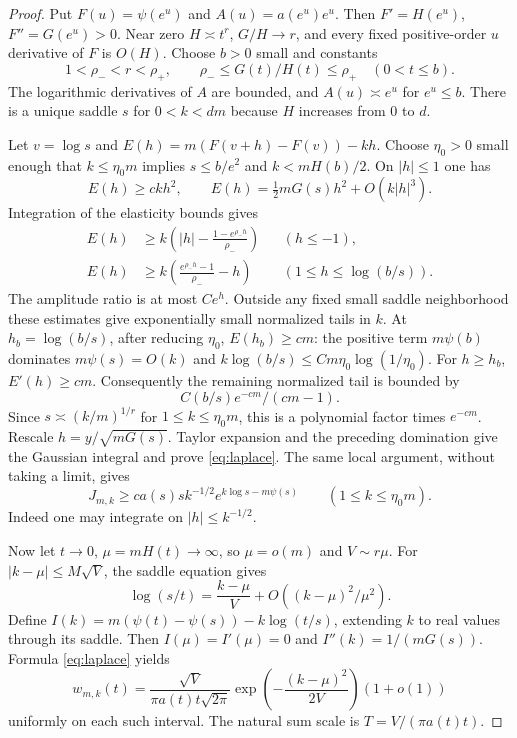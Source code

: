 \documentclass[11pt]{article}
\theoremstyle{remark}\newtheorem{remark}[theorem]{Remark}
\begin{document}
\begin{proof}
Put $F(u)=\psi(e^u)$ and $A(u)=a(e^u)e^u$. Then $F'=H(e^u)$,
$F''=G(e^u)>0$. Near zero $H\asymp t^r$, $G/H\to r$, and every
fixed positive-order $u$ derivative of $F$ is $O(H)$. Choose $b>0$
small and constants
\[
 1<\rho_-<r<\rho_+,
 \qquad \rho_-\leq G(t)/H(t)\leq\rho_+\quad(0<t\leq b).
\]
The logarithmic derivatives of $A$ are bounded, and $A(u)\asymp e^u$
for $e^u\leq b$. There is a unique saddle $s$ for $0<k<dm$ because
$H$ increases from $0$ to $d$.

Let $v=\log s$ and
$E(h)=m(F(v+h)-F(v))-kh$. Choose $\eta_0>0$ small enough that
$k\leq\eta_0m$ implies $s\leq b/e^2$ and $k<mH(b)/2$.
On $|h|\leq1$ one has
\[
 E(h)\geq ck h^2,\qquad
 E(h)=\tfrac12mG(s)h^2+O(k|h|^3).
\]
Integration of the elasticity bounds gives
\begin{align*}
 E(h)&\geq k\left(|h|-\frac{1-e^{\rho_-h}}{\rho_-}\right)
 &&(h\leq-1),\\
 E(h)&\geq k\left(\frac{e^{\rho_-h}-1}{\rho_-}-h\right)
 &&(1\leq h\leq\log(b/s)).
\end{align*}
The amplitude ratio is at most $Ce^h$. Outside any fixed small saddle
neighborhood these estimates give exponentially small normalized tails
in $k$. At $h_b=\log(b/s)$, after reducing $\eta_0$,
$E(h_b)\geq cm$: the positive term $m\psi(b)$ dominates
$m\psi(s)=O(k)$ and
$k\log(b/s)\leq Cm\eta_0\log(1/\eta_0)$.
For $h\geq h_b$, $E'(h)\geq cm$. Consequently the remaining normalized
tail is bounded by
\[
 C(b/s)e^{-cm}/(cm-1).
\]
Since $s\asymp(k/m)^{1/r}$ for $1\leq k\leq\eta_0m$, this is a
polynomial factor times $e^{-cm}$.
Rescale $h=y/\sqrt{mG(s)}$. Taylor expansion and the preceding domination
give the Gaussian integral and prove \eqref{eq:laplace}. The same local
argument, without taking a limit, gives
\begin{equation}\label{eq:lower-moment}
 J_{m,k}\geq c a(s)s k^{-1/2}e^{k\log s-m\psi(s)}
 \qquad(1\leq k\leq\eta_0m).
\end{equation}
Indeed one may integrate on $|h|\leq k^{-1/2}$.

Now let $t\to0$, $\mu=mH(t)\to\infty$, so $\mu=o(m)$ and
$V\sim r\mu$. For $|k-\mu|\leq M\sqrt V$, the saddle equation gives
\[
 \log(s/t)=\frac{k-\mu}{V}+O((k-\mu)^2/\mu^2).
\]
Define
$I(k)=m(\psi(t)-\psi(s))-k\log(t/s)$, extending $k$ to real
values through its saddle. Then $I(\mu)=I'(\mu)=0$ and
$I''(k)=1/(mG(s))$. Formula \eqref{eq:laplace} yields
\begin{equation}\label{eq:central}
 w_{m,k}(t)=\frac{\sqrt V}{\pi a(t)t\sqrt{2\pi}}
 \exp\left(-\frac{(k-\mu)^2}{2V}\right)(1+o(1))
\end{equation}
uniformly on each such interval. The natural sum scale is
$T=V/(\pi a(t)t)$.


\end{proof}
\end{document}
